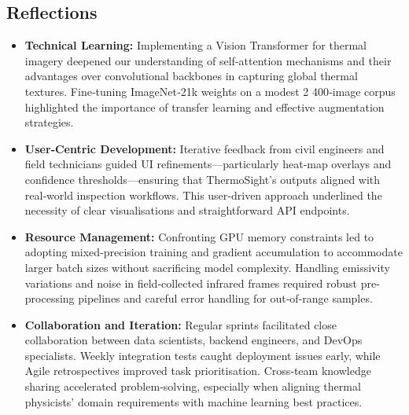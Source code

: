 \subsection{Reflections}
\begin{itemize}
    \item \textbf{Technical Learning:}  
    Implementing a Vision Transformer for thermal imagery deepened our understanding of self‐attention mechanisms and their advantages over convolutional backbones in capturing global thermal textures. Fine‐tuning ImageNet‐21k weights on a modest 2 400‐image corpus highlighted the importance of transfer learning and effective augmentation strategies.  
    \item \textbf{User‐Centric Development:}  
    Iterative feedback from civil engineers and field technicians guided UI refinements—particularly heat‐map overlays and confidence thresholds—ensuring that ThermoSight’s outputs aligned with real‐world inspection workflows. This user‐driven approach underlined the necessity of clear visualisations and straightforward API endpoints.  
    \item \textbf{Resource Management:}  
    Confronting GPU memory constraints led to adopting mixed‐precision training and gradient accumulation to accommodate larger batch sizes without sacrificing model complexity. Handling emissivity variations and noise in field‐collected infrared frames required robust pre‐processing pipelines and careful error handling for out‐of‐range samples.  
    \item \textbf{Collaboration and Iteration:}  
    Regular sprints facilitated close collaboration between data scientists, backend engineers, and DevOps specialists. Weekly integration tests caught deployment issues early, while Agile retrospectives improved task prioritisation. Cross‐team knowledge sharing accelerated problem‐solving, especially when aligning thermal physicists’ domain requirements with machine learning best practices.
\end{itemize}

